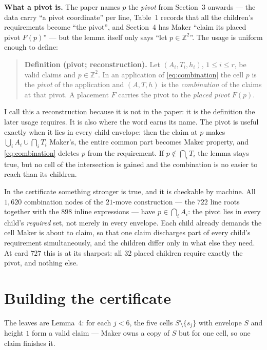 \documentclass[11pt,a4paper]{article}
\newcommand{\Z}{\mathbb Z}
\newcommand{\Snaky}{S}
\newcommand{\head}[1]{\vspace{4pt}\noindent\textbf{#1}\quad}
\begin{document}
\head{What a pivot is.} The paper names $p$ the \emph{pivot} from Section~3
onwards --- the data carry ``a pivot coordinate'' per line, Table~1 records that
all the children's requirements become ``the pivot'', and Section~4 has Maker
``claim its placed pivot $F(p)$'' --- but the lemma itself only says
``let $p\in\Z^2$''. The usage is uniform
enough to define:

\begin{quote}
\textbf{Definition (pivot; reconstruction).} Let $(A_i,T_i,h_i)$, $1\le i\le r$,
be valid claims and $p\in\Z^2$. In an application of \eqref{eq:combination} the
cell $p$ is the \emph{pivot} of the application and $(A,T,h)$ is the
\emph{combination} of the claims at that pivot. A placement $F$ carries the pivot
to the \emph{placed pivot} $F(p)$.
\end{quote}

I call this a reconstruction because it is not in the paper: it is the definition
the later usage requires. It is also where the word earns its name. The pivot is
useful exactly when it lies in every child envelope: then the claim at $p$ makes
$\bigcup_iA_i\cup\bigcap_iT_i$ Maker's, the entire common part becomes Maker
property, and \eqref{eq:combination} deletes $p$ from the requirement. If
$p\notin\bigcap_iT_i$ the lemma stays true, but no cell of the intersection is
gained and the combination is no easier to reach than its children.

In the certificate something stronger is true, and it is checkable by machine. All
$1{,}620$ combination nodes of the $21$-move construction --- the $722$ line
roots together with the $898$ inline expressions --- have $p\in\bigcap_iA_i$: the
pivot lies in every child's \emph{required} set, not merely in every envelope.
Each child already demands the cell Maker is about to claim, so that one claim
discharges part of every child's requirement simultaneously, and the children
differ only in what else they need. At card $727$ this is at its sharpest: all
$32$ placed children require exactly the pivot, and nothing else.



\section{Building the certificate}

The leaves are Lemma~4: for each $j<6$, the five cells $S\setminus\{s_j\}$ with
envelope $S$ and height $1$ form a valid claim --- Maker owns a copy of $\Snaky$
but for one cell, so one claim finishes it.
\end{document}
